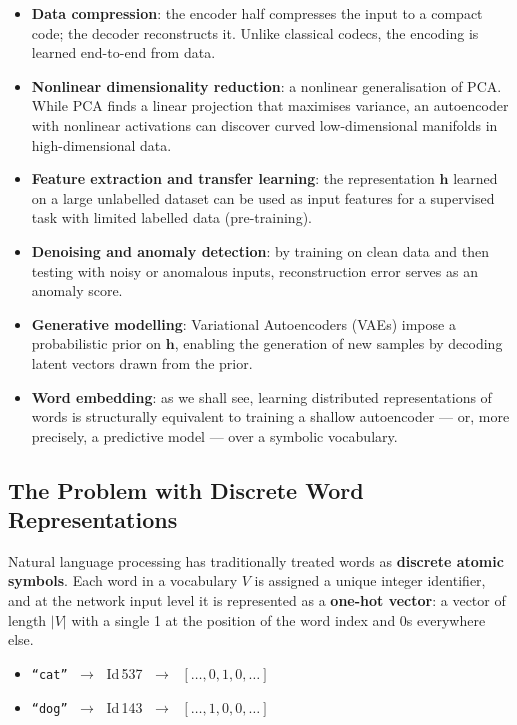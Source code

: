 \documentclass[11pt,a4paper]{article}
\newcommand{\term}[1]{\textcolor{DefGreen}{\textbf{#1}}}
\begin{document}
\begin{itemize}
  \item \textbf{Data compression}: the encoder half compresses the input to a compact code; the decoder reconstructs it. Unlike classical codecs, the encoding is learned end-to-end from data.
  \item \textbf{Nonlinear dimensionality reduction}: a nonlinear generalisation of PCA. While PCA finds a linear projection that maximises variance, an autoencoder with nonlinear activations can discover curved low-dimensional manifolds in high-dimensional data.
  \item \textbf{Feature extraction and transfer learning}: the representation $\mathbf{h}$ learned on a large unlabelled dataset can be used as input features for a supervised task with limited labelled data (pre-training).
  \item \textbf{Denoising and anomaly detection}: by training on clean data and then testing with noisy or anomalous inputs, reconstruction error serves as an anomaly score.
  \item \textbf{Generative modelling}: Variational Autoencoders (VAEs) impose a probabilistic prior on $\mathbf{h}$, enabling the generation of new samples by decoding latent vectors drawn from the prior.
  \item \textbf{Word embedding}: as we shall see, learning distributed representations of words is structurally equivalent to training a shallow autoencoder — or, more precisely, a predictive model — over a symbolic vocabulary.
\end{itemize}

\subsection{The Problem with Discrete Word Representations}
\label{sec:we_problem}

Natural language processing has traditionally treated words as \textbf{discrete atomic symbols}. Each word in a vocabulary $V$ is assigned a unique integer identifier, and at the network input level it is represented as a \term{one-hot vector}: a vector of length $|V|$ with a single 1 at the position of the word index and 0s everywhere else.

\begin{itemize}
  \item \texttt{``cat''} $\;\to\;$ Id\,537 $\;\to\;$ $[\ldots, 0, 1, 0, \ldots]$
  \item \texttt{``dog''} $\;\to\;$ Id\,143 $\;\to\;$ $[\ldots, 1, 0, 0, \ldots]$
\end{itemize}
\end{document}
